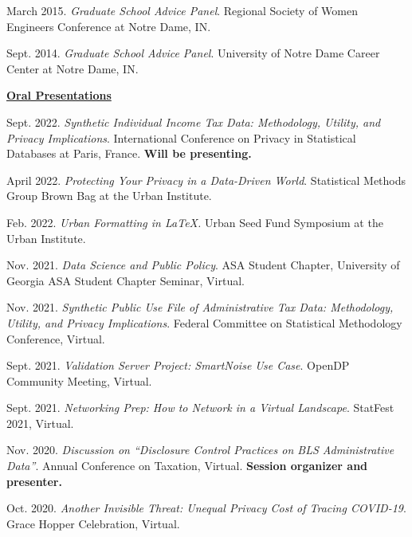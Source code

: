 \documentclass[11pt, letterpaper, roman]{moderncv} %
\begin{document}
\begin{etaremune}[topsep=0pt, itemsep=0.75pt, partopsep=0pt, parsep=0pt]
    \item March 2015. \textit{Graduate School Advice Panel}.  Regional Society of Women Engineers Conference at Notre Dame, IN.
    
    \item Sept. 2014. \textit{Graduate School Advice Panel}.  University of Notre Dame Career Center at Notre Dame, IN.
    
\vspace{6pt}
\hspace{-0.30in}\underline{\textbf{\large Oral Presentations}}\normalsize
    \item Sept. 2022. \textit{Synthetic Individual Income Tax Data: Methodology, Utility, and Privacy Implications}. International Conference on Privacy in Statistical Databases at Paris, France. \textbf{Will be presenting.}
    
    \item April 2022. \textit{Protecting Your Privacy in a Data-Driven World}. Statistical Methods Group Brown Bag at the Urban Institute.
    
    \item Feb. 2022. \textit{Urban Formatting in LaTeX.} Urban Seed Fund Symposium at the Urban Institute.

    \item Nov. 2021. \textit{Data Science and Public Policy}. ASA Student Chapter, University of Georgia ASA Student Chapter Seminar, Virtual.
    
    \item Nov. 2021. \textit{Synthetic Public Use File of Administrative Tax Data: Methodology, Utility, and Privacy Implications}. Federal Committee on Statistical Methodology Conference, Virtual.
    
    \item Sept. 2021. \textit{Validation Server Project: SmartNoise Use Case}. OpenDP Community Meeting, Virtual.
    
    \item Sept. 2021. \textit{Networking Prep: How to Network in a Virtual Landscape}. StatFest 2021, Virtual.
    
    \item Nov. 2020. \textit{Discussion on ``Disclosure Control Practices on BLS Administrative Data''}. Annual Conference on Taxation, Virtual. \textbf{Session organizer and presenter.}
    
    \item Oct. 2020. \textit{Another Invisible Threat: Unequal Privacy Cost of Tracing COVID-19}. Grace Hopper Celebration, Virtual.
    

\end{etaremune}
\end{document}
